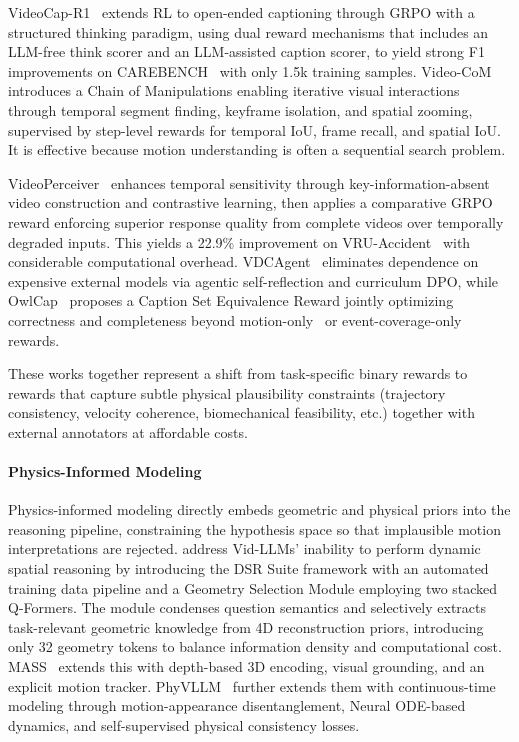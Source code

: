\documentclass[10pt]{article} %
\begin{document}
VideoCap-R1~\citep{Meng2025VideoCapR1EM} extends RL to open-ended captioning through GRPO with a structured thinking paradigm, using dual reward mechanisms that includes an LLM-free think scorer and an LLM-assisted caption scorer, to yield strong F1 improvements on CAREBENCH~\citep{xu2024carebench} with only 1.5k training samples. Video-CoM~\citep{Rasheed2025VideoCoMIV} introduces a Chain of Manipulations enabling iterative visual interactions through temporal segment finding, keyframe isolation, and spatial zooming, supervised by step-level rewards for temporal IoU, frame recall, and spatial IoU. It is effective because motion understanding is often a sequential search problem.

VideoPerceiver~\citep{Zhao2025VideoPerceiverEF} enhances temporal sensitivity through key-information-absent video construction and contrastive learning, then applies a comparative GRPO reward enforcing superior response quality from complete videos over temporally degraded inputs. This yields a 22.9\% improvement on VRU-Accident~\citep{kim2025vru} with considerable computational overhead. VDCAgent~\citep{Wang2025VDCAgentWV} eliminates dependence on expensive external models via agentic self-reflection and curriculum DPO, while OwlCap~\citep{Zhong2025OwlCapHM} proposes a Caption Set Equivalence Reward jointly optimizing correctness and completeness beyond motion-only~\citep{Wang2024TarsierRF} or event-coverage-only rewards.

These works together represent a shift from task-specific binary rewards to rewards that capture subtle physical plausibility constraints (trajectory consistency, velocity coherence, biomechanical feasibility, etc.) together with external annotators at affordable costs.

\paragraph{Physics-Informed Modeling}

Physics-informed modeling directly embeds geometric and physical priors into the reasoning pipeline, constraining the hypothesis space so that implausible motion interpretations are rejected. \citet{Zhou2025LearningTR} address Vid-LLMs' inability to perform dynamic spatial reasoning by introducing the DSR Suite framework with an automated training data pipeline and a Geometry Selection Module employing two stacked Q-Formers. The module condenses question semantics and selectively extracts task-relevant geometric knowledge from 4D reconstruction priors, introducing only 32 geometry tokens to balance information density and computational cost.
MASS~\citep{Wu2025MASSMS} extends this with depth-based 3D encoding, visual grounding, and an explicit motion tracker. PhyVLLM~\citep{Zhan2025PhyVLLMPV} further extends them with continuous-time modeling through motion-appearance disentanglement, Neural ODE-based dynamics, and self-supervised physical consistency losses.
\end{document}
